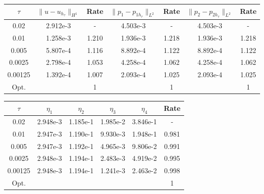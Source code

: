 \begin{center} 
\centering
\small
\begin{tabular}{c|c|c|c|c|c|c}
$\tau$ & $\|u-u_{h_{\tau}}\|_{H^1}$ & Rate & $\|p_1-p_{1h_{\tau}}\|_{L^2}$ & Rate & $\|p_2-p_{2h_{\tau}}\|_{L^2}$ & Rate \\\hline
0.02   	& 2.912e-3 & -     & 4.503e-3 & -     & 4.503e-3 &  -    \\
0.01   	& 1.258e-3 & 1.210 & 1.936e-3 & 1.218 & 1.936e-3 & 1.218 \\
0.005  	& 5.807e-4 & 1.116 & 8.892e-4 & 1.122 & 8.892e-4 & 1.122 \\
0.0025  & 2.798e-4 & 1.053 & 4.258e-4 & 1.062 & 4.258e-4 & 1.062 \\
0.00125 & 1.392e-4 & 1.007 & 2.093e-4 & 1.025 & 2.093e-4 & 1.025 \\ \hline
Opt. & & 1 & & 1  & & 1
\end{tabular}
\normalsize
{} \label{tab:bb_default_transfer_time_error}
\end{center}
\begin{center}
\centering
\begin{tabular}{c|c|c|c|c|c}
$\tau$ & $\eta_1$ & $\eta_2$ & $\eta_3$ & $\eta_4$ & Rate\\\hline
0.02    & 2.948e-3 & 1.185e-1 & 1.985e-2 & 3.846e-1 & -    \\
0.01    & 2.947e-3 & 1.190e-1 & 9.930e-3 & 1.948e-1 & 0.981\\
0.005   & 2.947e-3 & 1.192e-1 & 4.965e-3 & 9.806e-2 & 0.991\\
0.0025  & 2.948e-3 & 1.194e-1 & 2.483e-3 & 4.919e-2 & 0.995\\
0.00125 & 2.948e-3 & 1.194e-1 & 1.241e-3 & 2.463e-2 & 0.998\\\hline
Opt. & & & & & 1
\end{tabular}
  \label{tab:bb_default_transfer_time_est}
\end{center}
